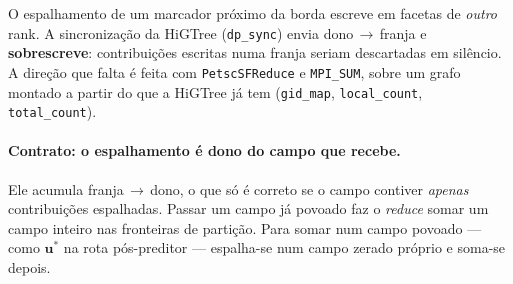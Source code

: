 O espalhamento de um marcador próximo da borda escreve em facetas de \emph{outro}
rank. A sincronização da HiGTree (\texttt{dp\_sync}) envia dono\,$\to$\,franja e
\textbf{sobrescreve}: contribuições escritas numa franja seriam descartadas em
silêncio. A direção que falta é feita com \texttt{PetscSFReduce} e
\texttt{MPI\_SUM}, sobre um grafo montado a partir do que a HiGTree já tem
(\texttt{gid\_map}, \texttt{local\_count}, \texttt{total\_count}).

\paragraph{Contrato: o espalhamento é dono do campo que recebe.} Ele acumula
franja\,$\to$\,dono, o que só é correto se o campo contiver \emph{apenas}
contribuições espalhadas. Passar um campo já povoado faz o \emph{reduce} somar
um campo inteiro nas fronteiras de partição. Para somar num campo povoado ---
como $\mathbf{u}^*$ na rota pós-preditor --- espalha-se num campo zerado próprio
e soma-se depois.
